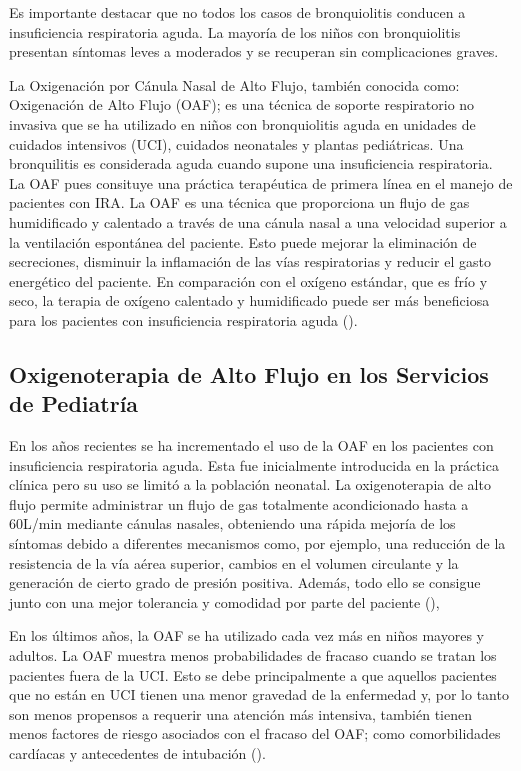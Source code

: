 Es importante destacar que no todos los casos de bronquiolitis conducen a insuficiencia respiratoria aguda. La mayoría de los niños con bronquiolitis presentan síntomas leves a moderados y se recuperan sin complicaciones graves. 

La Oxigenación por Cánula Nasal de Alto Flujo, también conocida como: Oxigenación de Alto Flujo (OAF); es una técnica de soporte respiratorio no invasiva que se ha utilizado en niños con bronquiolitis aguda en unidades de cuidados intensivos (UCI), cuidados neonatales y plantas pediátricas. Una bronquilitis es considerada aguda cuando supone una insuficiencia respiratoria. La OAF pues consituye una práctica terapéutica de primera línea en el manejo de pacientes con IRA. La OAF es una técnica que proporciona un flujo de gas humidificado y calentado a través de una cánula nasal a una velocidad superior a la ventilación espontánea del paciente. Esto puede mejorar la eliminación de secreciones, disminuir la inflamación de las vías respiratorias y reducir el gasto energético del paciente. En comparación con el oxígeno estándar, que es frío y seco, la terapia de oxígeno calentado y humidificado puede ser más beneficiosa para los pacientes con insuficiencia respiratoria aguda (\cite{Daverio2019}).


\subsection{Oxigenoterapia de Alto Flujo en los Servicios de Pediatría} 

En los años recientes se ha incrementado el uso de la OAF en los pacientes con insuficiencia respiratoria aguda. Esta fue inicialmente introducida en la práctica clínica pero su uso se limitó a la población neonatal. La oxigenoterapia de alto flujo permite administrar un flujo de gas totalmente acondicionado hasta a 60L/min mediante cánulas nasales, obteniendo una rápida mejoría de los síntomas debido a diferentes mecanismos como, por ejemplo, una reducción de la resistencia de la vía aérea superior, cambios en el volumen circulante y la generación de cierto grado de presión positiva. Además, todo ello se consigue junto con una mejor tolerancia y comodidad por parte del paciente (\cite{Masclans2015}),

En los últimos años, la OAF se ha utilizado cada vez más en niños mayores y adultos. La OAF muestra menos probabilidades de fracaso cuando se tratan los pacientes fuera de la UCI. Esto se debe principalmente a que aquellos pacientes que no están en UCI tienen una menor gravedad de la enfermedad y, por lo tanto son menos propensos a requerir una atención más intensiva, también tienen menos factores de riesgo asociados con el fracaso del OAF; como comorbilidades cardíacas y antecedentes de intubación (\cite{Betters2017}). 

